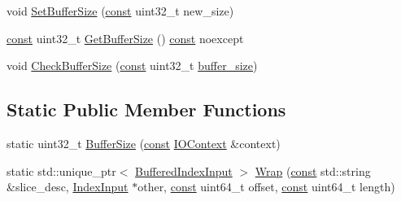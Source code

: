 \begin{DoxyCompactItemize}
\item 
void \mbox{\hyperlink{classlucene_1_1core_1_1store_1_1BufferedIndexInput_aceef7ceac7a71e741f70fa5ae45da43e}{Set\+Buffer\+Size}} (\mbox{\hyperlink{ZlibCrc32_8h_a2c212835823e3c54a8ab6d95c652660e}{const}} uint32\+\_\+t new\+\_\+size)
\item 
\mbox{\hyperlink{ZlibCrc32_8h_a2c212835823e3c54a8ab6d95c652660e}{const}} uint32\+\_\+t \mbox{\hyperlink{classlucene_1_1core_1_1store_1_1BufferedIndexInput_aae690306af9e37eb0e5fb10908e626cf}{Get\+Buffer\+Size}} () \mbox{\hyperlink{ZlibCrc32_8h_a2c212835823e3c54a8ab6d95c652660e}{const}} noexcept
\item 
void \mbox{\hyperlink{classlucene_1_1core_1_1store_1_1BufferedIndexInput_a0c6faca9fc90d28704034519b5e8e896}{Check\+Buffer\+Size}} (\mbox{\hyperlink{ZlibCrc32_8h_a2c212835823e3c54a8ab6d95c652660e}{const}} uint32\+\_\+t \mbox{\hyperlink{classlucene_1_1core_1_1store_1_1BufferedIndexInput_a93fdee4afc7f7efba930969747112f8a}{buffer\+\_\+size}})
\end{DoxyCompactItemize}
\subsection*{Static Public Member Functions}
\begin{DoxyCompactItemize}
\item 
static uint32\+\_\+t \mbox{\hyperlink{classlucene_1_1core_1_1store_1_1BufferedIndexInput_abc144773f0e3fa92aff2c451c0cbde5e}{Buffer\+Size}} (\mbox{\hyperlink{ZlibCrc32_8h_a2c212835823e3c54a8ab6d95c652660e}{const}} \mbox{\hyperlink{classlucene_1_1core_1_1store_1_1IOContext}{I\+O\+Context}} \&context)
\item 
static std\+::unique\+\_\+ptr$<$ \mbox{\hyperlink{classlucene_1_1core_1_1store_1_1BufferedIndexInput}{Buffered\+Index\+Input}} $>$ \mbox{\hyperlink{classlucene_1_1core_1_1store_1_1BufferedIndexInput_a9e411949294cb06b40563e528f49b856}{Wrap}} (\mbox{\hyperlink{ZlibCrc32_8h_a2c212835823e3c54a8ab6d95c652660e}{const}} std\+::string \&slice\+\_\+desc, \mbox{\hyperlink{classlucene_1_1core_1_1store_1_1IndexInput}{Index\+Input}} $\ast$other, \mbox{\hyperlink{ZlibCrc32_8h_a2c212835823e3c54a8ab6d95c652660e}{const}} uint64\+\_\+t offset, \mbox{\hyperlink{ZlibCrc32_8h_a2c212835823e3c54a8ab6d95c652660e}{const}} uint64\+\_\+t length)
\end{DoxyCompactItemize}
